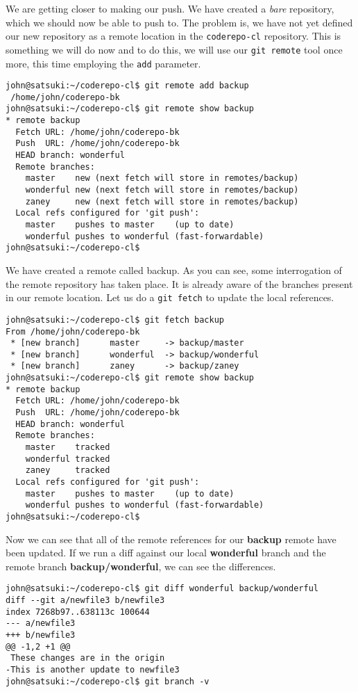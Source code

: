 We are getting closer to making our push.  We have created a \emph{bare} repository, which we should now be able to push to.  The problem is, we have not yet defined our new repository as a remote location in the \texttt{coderepo-cl} repository.  This is something we will do now and to do this, we will use our \texttt{git remote} tool once more, this time employing the \texttt{add} parameter.

\begin{Verbatim}
john@satsuki:~/coderepo-cl$ git remote add backup 
 /home/john/coderepo-bk
john@satsuki:~/coderepo-cl$ git remote show backup
* remote backup
  Fetch URL: /home/john/coderepo-bk
  Push  URL: /home/john/coderepo-bk
  HEAD branch: wonderful
  Remote branches:
    master    new (next fetch will store in remotes/backup)
    wonderful new (next fetch will store in remotes/backup)
    zaney     new (next fetch will store in remotes/backup)
  Local refs configured for 'git push':
    master    pushes to master    (up to date)
    wonderful pushes to wonderful (fast-forwardable)
john@satsuki:~/coderepo-cl$ 
\end{Verbatim}

We have created a remote called backup.  As you can see, some interrogation of the remote repository has taken place.  It is already aware of the branches present in our remote location.  Let us do a \texttt{git fetch} to update the local references.

\begin{Verbatim}
john@satsuki:~/coderepo-cl$ git fetch backup
From /home/john/coderepo-bk
 * [new branch]      master     -> backup/master
 * [new branch]      wonderful  -> backup/wonderful
 * [new branch]      zaney      -> backup/zaney
john@satsuki:~/coderepo-cl$ git remote show backup
* remote backup
  Fetch URL: /home/john/coderepo-bk
  Push  URL: /home/john/coderepo-bk
  HEAD branch: wonderful
  Remote branches:
    master    tracked
    wonderful tracked
    zaney     tracked
  Local refs configured for 'git push':
    master    pushes to master    (up to date)
    wonderful pushes to wonderful (fast-forwardable)
john@satsuki:~/coderepo-cl$ 
\end{Verbatim}

Now we can see that all of the remote references for our \textbf{backup} remote have been updated.  If we run a diff against our local \textbf{wonderful} branch and the remote branch \textbf{backup/wonderful}, we can see the differences.

\begin{Verbatim}
john@satsuki:~/coderepo-cl$ git diff wonderful backup/wonderful 
diff --git a/newfile3 b/newfile3
index 7268b97..638113c 100644
--- a/newfile3
+++ b/newfile3
@@ -1,2 +1 @@
 These changes are in the origin
-This is another update to newfile3
john@satsuki:~/coderepo-cl$ git branch -v
\end{Verbatim}

